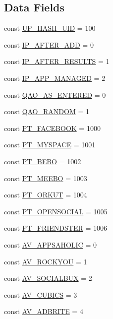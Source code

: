 \subsection*{Data Fields}
\begin{DoxyCompactItemize}
\item 
const \hyperlink{classSF_a971fec4a94c055f1e9cfbb6108b186a8}{UP\_\-HASH\_\-UID} = 100
\item 
const \hyperlink{classSF_a784e119a8dc4eba2b5560832e8b737f0}{IP\_\-AFTER\_\-ADD} = 0
\item 
const \hyperlink{classSF_a2071040416c247d57cda2ea628331c72}{IP\_\-AFTER\_\-RESULTS} = 1
\item 
const \hyperlink{classSF_a22eebe42ba8477df8d917b9b7a88d33f}{IP\_\-APP\_\-MANAGED} = 2
\item 
const \hyperlink{classSF_a765b7752897066d1b31803b5c242615f}{QAO\_\-AS\_\-ENTERED} = 0
\item 
const \hyperlink{classSF_aa7dc78abec7a46baca89375311bbeae4}{QAO\_\-RANDOM} = 1
\item 
const \hyperlink{classSF_a9e8fafa39429831b857bb06424d74dae}{PT\_\-FACEBOOK} = 1000
\item 
const \hyperlink{classSF_a78190e4161de1deb7e2928e801539df5}{PT\_\-MYSPACE} = 1001
\item 
const \hyperlink{classSF_a44c3e775e3f80d5b3fa3e1d745705126}{PT\_\-BEBO} = 1002
\item 
const \hyperlink{classSF_a17932752f1340529dfb7ed5daa5c0eb9}{PT\_\-MEEBO} = 1003
\item 
const \hyperlink{classSF_aefc31cd8062b5d277a253b83b34804e8}{PT\_\-ORKUT} = 1004
\item 
const \hyperlink{classSF_a07ad1f7c2b80fbcab3550bfc7ff9fcb4}{PT\_\-OPENSOCIAL} = 1005
\item 
const \hyperlink{classSF_a68ee53bd9120191897b1bbf694e1312c}{PT\_\-FRIENDSTER} = 1006
\item 
const \hyperlink{classSF_ab7242b4b78720ce32da2389d93512434}{AV\_\-APPSAHOLIC} = 0
\item 
const \hyperlink{classSF_a0ad6babe9e135118c3e70340a7a9c156}{AV\_\-ROCKYOU} = 1
\item 
const \hyperlink{classSF_af000b8454bbc1a09a408a72f35051d24}{AV\_\-SOCIALBUX} = 2
\item 
const \hyperlink{classSF_aed83d2256a6d5946f1281003404608e0}{AV\_\-CUBICS} = 3
\item 
const \hyperlink{classSF_ac426936bf124441cc66b462fead5e51c}{AV\_\-ADBRITE} = 4
\item 

\end{DoxyCompactItemize}
